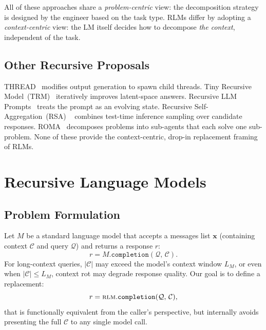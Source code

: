 \documentclass[journal, 10pt, letterpaper]{IEEEtran}
\newcommand{\rlm}{\textsc{rlm}}
\newcommand{\code}[1]{\texttt{#1}}
\begin{document}
All of these approaches share a \emph{problem-centric} view: the decomposition
strategy is designed by the engineer based on the task type.  RLMs differ by
adopting a \emph{context-centric} view: the LM itself decides how to decompose
\emph{the context}, independent of the task.

\subsection{Other Recursive Proposals}

THREAD~\cite{besta2024thread} modifies output generation to spawn child
threads.  Tiny Recursive Model~(TRM)~\cite{trm2024} iteratively improves
latent-space answers.  Recursive LLM Prompts~\cite{konwinski2023recursive}
treats the prompt as an evolving state.  Recursive Self-Aggregation~(RSA)%
~\cite{rsa2025} combines test-time inference sampling over candidate
responses.  ROMA~\cite{roma2025} decomposes problems into sub-agents that each
solve one sub-problem.  None of these provide the context-centric, drop-in
replacement framing of RLMs.

\section{Recursive Language Models}
\label{sec:method}

\subsection{Problem Formulation}

Let $M$ be a standard language model that accepts a messages list $\mathbf{x}$
(containing context $\mathcal{C}$ and query $\mathcal{Q}$) and returns a
response $r$:
\begin{equation}
  r = M.\code{completion}(\mathcal{Q},\, \mathcal{C}).
\end{equation}
For long-context queries, $|\mathcal{C}|$ may exceed the model's context
window $L_M$, or even when $|\mathcal{C}| \le L_M$, context rot may degrade
response quality.  Our goal is to define a replacement:
\begin{equation}
  r = \text{\rlm}.\code{completion}(\mathcal{Q},\, \mathcal{C}),
\end{equation}
that is functionally equivalent from the caller's perspective, but internally
avoids presenting the full $\mathcal{C}$ to any single model call.
\end{document}
